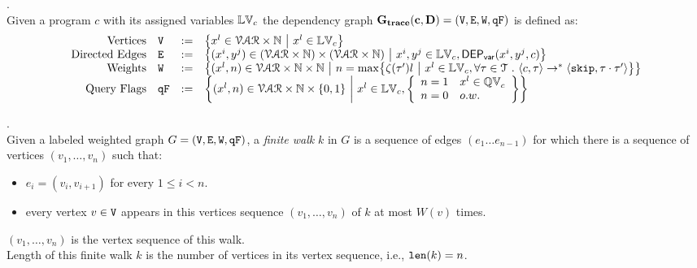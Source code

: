 %
%
\begin{defn}.
\\
Given a program ${c}$ with its assigned variables $\mathbb{LV}_c$ 
the dependency graph $\bf{G_{trace}}({c}, D) = (\mathtt{V}, \mathtt{E}, \mathtt{W}, \mathtt{qF})$ is defined as:
%
\[
\begin{array}{rlcl}
  \text{Vertices} &
  \vertxs & := & \left\{ 
  x^l \in \mathcal{VAR} \times \mathbb{N} 
  ~ \middle\vert ~ x^l \in \lvar_{c}
  \right\}
  \\
  \text{Directed Edges} &
  \edges & := & 
  \left\{ 
  (x^i, y^j) \in (\mathcal{VAR} \times \mathbb{N}) \times (\mathcal{VAR} \times \mathbb{N})
  ~ \middle\vert ~
  x^i, y^j \in \lvar_{{c}}, \vardep(x^i, y^j, c)
  
  \right\}
  \\
  \text{Weights} &
  \weights & := & 
  \left\{ 
  (x^l, n) \in \mathcal{VAR} \times \mathbb{N} \times \mathbb{N}
  ~ \middle\vert ~ 
  n = \max \left\{ \vcounter(\vtrace') l ~ \middle\vert ~ x^l \in \lvar_{c},
  \forall \vtrace \in \mathcal{T} \st \config{{c}, \trace} \to^{*} \config{\eskip, \trace\cdot\vtrace'} 
   \right\}
  \right\}
  \\
  \text{Query Flags} &
  \qflag & := & 
  \left\{(x^l, n)  \in \mathcal{VAR} \times \mathbb{N}  \times \{0, 1\} 
  ~ \middle\vert ~
   x^l \in \lvar_{c},
   \left\{
  \begin{array}{ll}
  n = 1 & x^l \in \qvar_{c} \\ 
  n = 0 & o.w.
  \end{array}
  \right\}
  \right\}
\end{array}
\]
\end{defn}
%
%
\begin{defn}.
\label{def:finitewalk}
\\
Given a labeled weighted graph $G = (\mathtt{V}, \mathtt{E}, \mathtt{W}, \mathtt{qF})$, a \emph{finite walk} $k$ in $G$ is a sequence of edges $(e_1 \ldots e_{n - 1})$ 
for which there is a sequence of vertices $(v_1, \ldots, v_{n})$ such that:
\begin{itemize}
    \item $e_i = (v_{i},v_{i + 1})$ for every $1 \leq i < n$.
    \item every vertex $v \in \mathtt{V}$ appears in this vertices sequence $(v_1, \ldots, v_{n})$ of $k$ at most $W(v)$ times.  
\end{itemize}
$(v_1, \ldots, v_{n})$ is the vertex sequence of this walk.
\\
%
Length of this finite walk $k$ is the number of vertices in its vertex sequence, i.e., $\mathtt{len}(k) = n$.
\end{defn}

